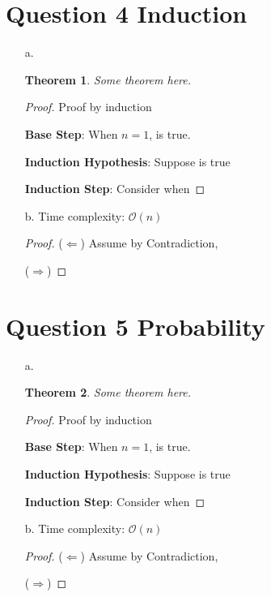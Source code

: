 \documentclass[11pt,fleqn]{article}
\newcommand{\bigO}{\ensuremath{\mathcal{O}}}
\newcommand{\Base}{\textbf{Base Step}: }
\newcommand{\IH}{\textbf{Induction Hypothesis}: }
\newcommand{\IS}{\textbf{Induction Step}: }
\newtheorem*{theorem}{Theorem}
\theoremstyle{definition}
\theoremstyle{remark}
\begin{document}
\section{Question 4 Induction}
\begin{enumerate}
    \item[a.]
    \begin{theorem}
        Some theorem here.
    \end{theorem}
    \begin{proof} Proof by induction
    
    \Base {When $n=1$, is true.}
    
    \IH {Suppose is true}
    
    \IS Consider when 
    \end{proof}
    
    \item[b.]
    Time complexity: $\bigO (n)$
    \begin{proof}
    ($\Leftarrow$) Assume by Contradiction,
    
    ($\Rightarrow$)
    \end{proof}
    
\end{enumerate}
\newpage
\clearpage

\section{Question 5 Probability}
\begin{enumerate}
    \item[a.]
    \begin{theorem}
        Some theorem here.
    \end{theorem}
    \begin{proof} Proof by induction
    
    \Base {When $n=1$, is true.}
    
    \IH {Suppose is true}
    
    \IS Consider when 
    \end{proof}
    
    \item[b.]
    Time complexity: $\bigO (n)$
    \begin{proof}
    ($\Leftarrow$) Assume by Contradiction,
    
    ($\Rightarrow$)
    \end{proof}
    
\end{enumerate}
\newpage
\clearpage
\end{document}
